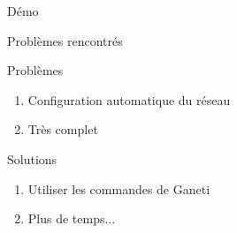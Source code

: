\begin{frame}
  \begin{center}
   \huge{Démo}
  \end{center}
\end{frame}

\begin{frame}{Problèmes rencontrés}
 \begin{alertblock}{Problèmes}
   \begin{enumerate}
     \item Configuration automatique du réseau
       \pause
     \item Très complet
       \pause
   \end{enumerate}
 \end{alertblock}
\pause
 \begin{exampleblock}{Solutions}
   \begin{enumerate}
     \item Utiliser les commandes de Ganeti
       \pause
     \item Plus de temps...
   \end{enumerate}
 \end{exampleblock}
\end{frame}



%
